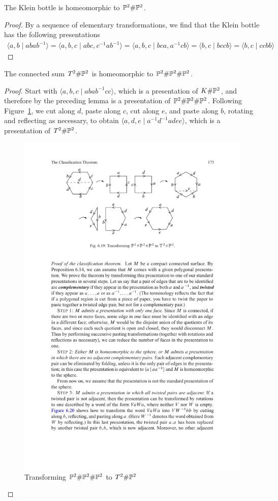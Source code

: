 \begin{lemma}
The Klein bottle is homeomorphic to $\P^2\#\P^2$.
\end{lemma}
\begin{proof}
By a sequence of elementary transformations, we find that the Klein bottle has the following presentations
\begin{align*}
\langle a,b\mid abab^{-1}\rangle=\langle a,b,c\mid abc,c^{-1}ab^{-1}\rangle=\langle a,b,c\mid bca,a^{-1}cb\rangle=\langle b,c\mid bccb\rangle=\langle b,c\mid ccbb\rangle
\end{align*}
\end{proof}
\begin{lemma}\label{T^2 sum P^2}
The connected sum $T^2\#\P^2$ is homeomorphic to $\P^2\#\P^2\#\P^2$.
\end{lemma}
\begin{proof}
Start with $\langle a,b,c\mid abab^{-1}cc\rangle$, which is a presentation of $K\#\P^2$,
and therefore by the preceding lemma is a presentation of $\P^2\#\P^2\#\P^2$. Following Figure~\ref{P^2sumT^2}, we cut along $d$, paste along $c$, cut along $e$, and paste along $b$, rotating and reflecting as necessary, to obtain $\langle a,d,e\mid a^{-1}d^{-1}adee\rangle$, which is a presentation of $T^2\#\P^2$.
\begin{figure}[!h]
\centering
\includegraphics{T^2sumP^2}
\caption{Transforming $\P^2\#\P^2\#\P^2$ to $T^2\#\P^2$}
\label{P^2sumT^2}
\end{figure}
\end{proof}
